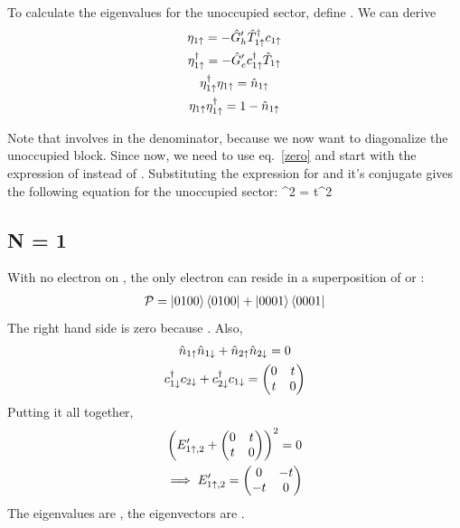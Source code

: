\documentclass[12pt]{article}
\begin{document}
\subsection{}
To calculate the eigenvalues for the unoccupied sector, define . We can derive
\begin{gather}
    \eta_{1\uparrow} = -\hat G_h^\prime \hat T_{1\uparrow}^\dagger c_{1\uparrow}\label{now} \\
        \eta^\dagger_{1\uparrow} = -\hat G_e^\prime c_{1\uparrow}^\dagger\hat T_{1\uparrow}\label{etad2}\\
        \eta^\dagger_{1\uparrow}\eta_{1\uparrow}=\hat n_{1\uparrow} \\
        \eta_{1\uparrow}\eta^\dagger_{1\uparrow}=1-\hat n_{1\uparrow}\label{zero}
\end{gather}

Note that  involves  in the denominator, because we now want to diagonalize the unoccupied block. Since  now, we need to use eq.~\ref{zero} and start with the expression of  instead of \il{\eta^\dagger_{1\ua}}. Substituting the expression for \il{\eta_{1\ua}} and it's conjugate gives the following equation for the unoccupied sector:
\beq
{}^2 = t^2 \nc
\eeq

\subsection{N = 1}

With no electron on , the only electron can reside in a superposition of  or :
\begin{gather}
    \mathcal{P} = \ket{0100}\bra{0100} + \ket{0001}\bra{0001}
\end{gather}
The right hand side is zero because . Also,
\begin{gather}
    \hat n_{1\uparrow}\hat n_{1\downarrow}+\hat n_{2\uparrow}\hat n_{2\downarrow} = 0\\
    c_{1\downarrow}^\dagger c_{2\downarrow}+c_{2\downarrow}^\dagger c_{1\downarrow} = \begin{pmatrix} 0 & t \\ t & 0 \end{pmatrix}
\end{gather}
Putting it all together,
\begin{gather}
    \left({E^\prime_{1\uparrow,2}+ \begin{pmatrix} 0 & t \\ t & 0 \end{pmatrix}}\right)^2 = 0 \\
    \implies E^\prime_{1\uparrow,2}= \begin{pmatrix} 0 & -t \\ -t & 0 \end{pmatrix}\label{eval}
\end{gather}
The eigenvalues are , the eigenvectors are . 
\end{document}
